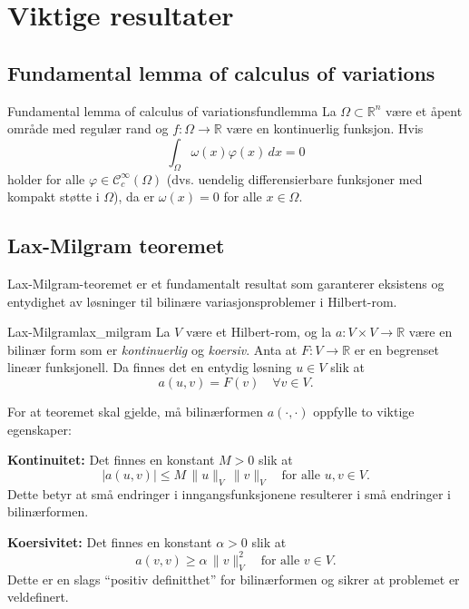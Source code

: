 \documentclass[../../main.tex]{subfiles}
\begin{document}
\section{Viktige resultater}
\label{sec:theorems}

\subsection{Fundamental lemma of calculus of variations}
\begin{lemma}{Fundamental lemma of calculus of variations}{fundlemma}
    La $\Omega \subset \mathbb{R}^n$ være et åpent område med regulær rand og $f: \Omega \rightarrow \mathbb{R}$ være en kontinuerlig funksjon.
    Hvis
    \begin{equation}
        \int_{\Omega} \omega(x) \varphi(x) \, dx = 0
    \end{equation}
    holder for alle $\varphi \in \mathcal{C}_c^{\infty}(\Omega)$ (dvs. uendelig differensierbare funksjoner med kompakt støtte i $\Omega$), da er $\omega(x) = 0$ for alle $x \in \Omega$.
\end{lemma}


\subsection{Lax-Milgram teoremet}
Lax-Milgram-teoremet er et fundamentalt resultat som garanterer eksistens og entydighet av løsninger til bilinære variasjonsproblemer i Hilbert-rom.
\begin{theorem}{Lax-Milgram}{lax_milgram}
    La $V$ være et Hilbert-rom, og la $a: V \times V \to \mathbb{R}$ være en bilinær form som er \emph{kontinuerlig} og \emph{koersiv}. Anta at $F: V \to \mathbb{R}$ er en begrenset lineær funksjonell. Da finnes det en entydig løsning $u \in V$ slik at
    \[
        a(u,v) = F(v) \quad \forall v \in V.
    \]
\end{theorem}

For at teoremet skal gjelde, må bilinærformen $a(\cdot, \cdot)$ oppfylle to viktige egenskaper:

\textbf{Kontinuitet:} Det finnes en konstant $M > 0$ slik at
\[
    |a(u,v)| \leq M\, \|u\|_V\, \|v\|_V \quad \text{for alle } u,v\in V.
\]
Dette betyr at små endringer i inngangsfunksjonene resulterer i små endringer i bilinærformen.

\textbf{Koersivitet:} Det finnes en konstant $\alpha > 0$ slik at
\[
    a(v,v) \geq \alpha\, \|v\|_V^2 \quad \text{for alle } v\in V.
\]
Dette er en slags \enquote{positiv definitthet} for bilinærformen og sikrer at problemet er veldefinert.
\end{document}

